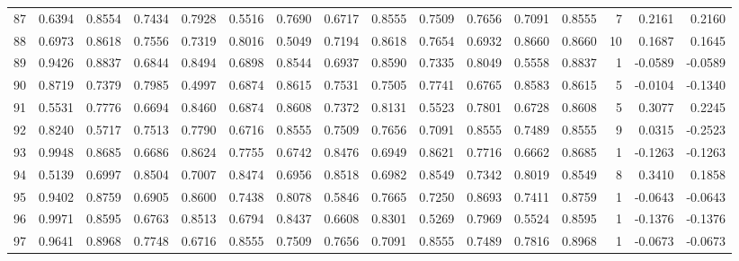 \begin{tabular}{lrrrrrrrrrrrrrrr}
87  &      0.6394 &  0.8554 &  0.7434 &  0.7928 &  0.5516 &  0.7690 &  0.6717 &  0.8555 &  0.7509 &  0.7656 &   0.7091 &     0.8555 &      7 &                    0.2161 &                     0.2160 \\
88  &      0.6973 &  0.8618 &  0.7556 &  0.7319 &  0.8016 &  0.5049 &  0.7194 &  0.8618 &  0.7654 &  0.6932 &   0.8660 &     0.8660 &     10 &                    0.1687 &                     0.1645 \\
89  &      0.9426 &  0.8837 &  0.6844 &  0.8494 &  0.6898 &  0.8544 &  0.6937 &  0.8590 &  0.7335 &  0.8049 &   0.5558 &     0.8837 &      1 &                   -0.0589 &                    -0.0589 \\
90  &      0.8719 &  0.7379 &  0.7985 &  0.4997 &  0.6874 &  0.8615 &  0.7531 &  0.7505 &  0.7741 &  0.6765 &   0.8583 &     0.8615 &      5 &                   -0.0104 &                    -0.1340 \\
91  &      0.5531 &  0.7776 &  0.6694 &  0.8460 &  0.6874 &  0.8608 &  0.7372 &  0.8131 &  0.5523 &  0.7801 &   0.6728 &     0.8608 &      5 &                    0.3077 &                     0.2245 \\
92  &      0.8240 &  0.5717 &  0.7513 &  0.7790 &  0.6716 &  0.8555 &  0.7509 &  0.7656 &  0.7091 &  0.8555 &   0.7489 &     0.8555 &      9 &                    0.0315 &                    -0.2523 \\
93  &      0.9948 &  0.8685 &  0.6686 &  0.8624 &  0.7755 &  0.6742 &  0.8476 &  0.6949 &  0.8621 &  0.7716 &   0.6662 &     0.8685 &      1 &                   -0.1263 &                    -0.1263 \\
94  &      0.5139 &  0.6997 &  0.8504 &  0.7007 &  0.8474 &  0.6956 &  0.8518 &  0.6982 &  0.8549 &  0.7342 &   0.8019 &     0.8549 &      8 &                    0.3410 &                     0.1858 \\
95  &      0.9402 &  0.8759 &  0.6905 &  0.8600 &  0.7438 &  0.8078 &  0.5846 &  0.7665 &  0.7250 &  0.8693 &   0.7411 &     0.8759 &      1 &                   -0.0643 &                    -0.0643 \\
96  &      0.9971 &  0.8595 &  0.6763 &  0.8513 &  0.6794 &  0.8437 &  0.6608 &  0.8301 &  0.5269 &  0.7969 &   0.5524 &     0.8595 &      1 &                   -0.1376 &                    -0.1376 \\
97  &      0.9641 &  0.8968 &  0.7748 &  0.6716 &  0.8555 &  0.7509 &  0.7656 &  0.7091 &  0.8555 &  0.7489 &   0.7816 &     0.8968 &      1 &                   -0.0673 &                    -0.0673 \\

\end{tabular}
